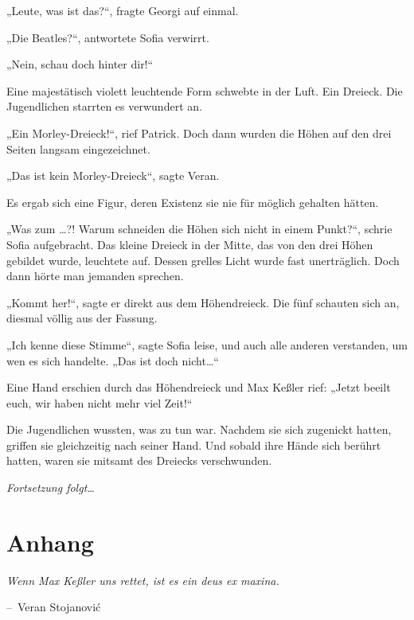 \documentclass[oneside]{memoir}
\makeatletter
\newenvironment{chapquote}[2][2em]
  {\setlength{\@tempdima}{#1}%
   \def\chapquote@author{#2}%
   \parshape 1 \@tempdima \dimexpr\textwidth-2\@tempdima\relax%
   \itshape}
  {\par\normalfont\hfill--\ \chapquote@author\hspace*{\@tempdima}\par\bigskip}
\makeatother
\begin{document}
„Leute, was ist das?“, fragte Georgi auf einmal.

„Die Beatles?“, antwortete Sofia verwirrt.

„Nein, schau doch hinter dir!“

Eine majestätisch violett leuchtende Form schwebte in der Luft. Ein Dreieck. Die Jugendlichen starrten es verwundert an.

„Ein Morley-Dreieck!“, rief Patrick. Doch dann wurden die Höhen auf den drei Seiten langsam eingezeichnet.

„Das ist kein Morley-Dreieck“, sagte Veran.

Es ergab sich eine Figur, deren Existenz sie nie für möglich gehalten hätten.

„Was zum \ldots?! Warum schneiden die Höhen sich nicht in einem Punkt?“, schrie Sofia aufgebracht. Das kleine Dreieck in der Mitte, das von den drei Höhen gebildet wurde, leuchtete auf. Dessen grelles Licht wurde fast unerträglich. Doch dann hörte man jemanden sprechen. 

„Kommt her!“, sagte er direkt aus dem Höhendreieck. Die fünf schauten sich an, diesmal völlig aus der Fassung.

„Ich kenne diese Stimme“, sagte Sofia leise, und auch alle anderen verstanden, um wen es sich handelte. „Das ist doch nicht\ldots“

Eine Hand erschien durch das Höhendreieck und Max Keßler rief: „Jetzt beeilt euch, wir haben nicht mehr viel Zeit!“

Die Jugendlichen wussten, was zu tun war. Nachdem sie sich zugenickt hatten, griffen sie gleichzeitig nach seiner Hand. Und sobald ihre Hände sich berührt hatten, waren sie mitsamt des Dreiecks verschwunden.
\newpage
\thispagestyle{empty}
\begin{center}
\textit{Fortsetzung folgt\ldots}
\end{center}

\chapter{Anhang}
\begin{chapquote}{Veran Stojanović}
\glqq Wenn Max Keßler uns rettet, ist es ein deus ex maxina.\grqq
\end{chapquote}
\end{document}
